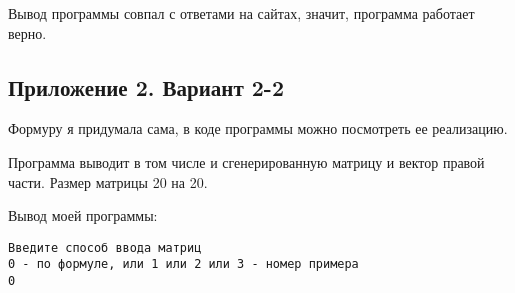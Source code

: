 \documentclass[a4paper,12pt,titlepage,finall]{article}
\begin{document}
Вывод программы совпал с ответами на сайтах, значит, программа работает верно.

\newpage

\subsection{Приложение 2. Вариант 2-2}

Формуру я придумала сама, в коде программы можно посмотреть ее реализацию.

Программа выводит в том числе и сгенерированную матрицу и вектор правой части.
Размер матрицы 20 на 20.


Вывод моей программы:

\begin{verbatim}
Введите способ ввода матриц
0 - по формуле, или 1 или 2 или 3 - номер примера
0


\end{verbatim}
\end{document}
